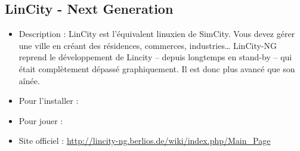 \subsection{LinCity - Next Generation}
\begin{itemize}
\begingroup
{}
\item Description : LinCity est l'équivalent linuxien de SimCity. Vous devez gérer une ville en créant des résidences, commerces, industries\ldots{} LinCity-NG reprend le développement de Lincity -- depuis longtemps en stand-by -- qui était complètement dépassé graphiquement. Il est donc plus avancé que son aînée.{\par}
\endgroup
\item Pour l'installer : 
\item Pour jouer : 
\item Site officiel : \url{http://lincity-ng.berlios.de/wiki/index.php/Main_Page}{\par}
\end{itemize}

